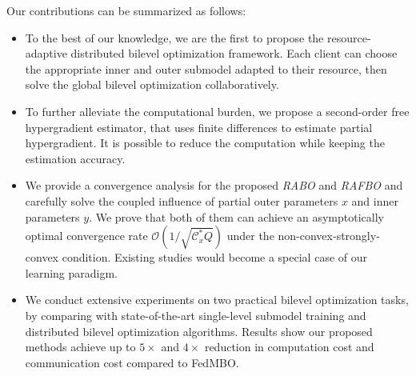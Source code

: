 \documentclass[lettersize,journal]{IEEEtran}
\begin{document}
Our contributions can be summarized as follows:
\begin{itemize}
\item To the best of our knowledge, we are the first to propose the resource-adaptive distributed bilevel optimization framework. Each client can choose the appropriate inner and outer submodel adapted to their resource, then solve the global bilevel optimization collaboratively. 
\item To further alleviate the computational burden, we propose a second-order free hypergradient estimator, that uses finite differences to estimate partial hypergradient. It is possible to reduce the computation while keeping the estimation accuracy.
\item We provide a convergence analysis for the proposed \textit{RABO} and \textit{RAFBO} and carefully solve the coupled influence of partial outer parameters $x$ and inner parameters $y$. We prove that both of them can achieve an asymptotically optimal convergence rate $\mathcal{O}(1/\sqrt{\mathcal{C}^*_xQ})$ under the non-convex-strongly-convex condition. Existing studies would become a special case of our learning paradigm.
\item We conduct extensive experiments on two practical bilevel optimization tasks, by comparing with state-of-the-art single-level submodel training and distributed bilevel optimization algorithms. Results show our proposed methods achieve up to  $5\times$  and $4\times$ reduction in computation cost and communication cost compared to FedMBO. 
\end{itemize}



\end{document}

